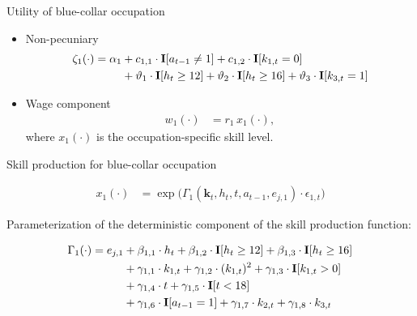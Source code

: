 \begin{frame}{Utility of blue-collar occupation}\vspace{0.25cm}

	\begin{itemize}\setlength\itemsep{1em}
	\item Non-pecuniary
  \begin{align*}
  \zeta_{1}(\cdot)  = \alpha_1 & + c_{1,1} \cdot {\textbf{I}}[a_{t-1} \neq 1] + c_{1,2} \cdot {\textbf{I}}[k_{1,t} = 0] \\
                              & + \vartheta_1 \cdot {\textbf{I}}[h_t \geq 12] + \vartheta_2 \cdot {\textbf{I}}[h_t \geq 16] + \vartheta_3 \cdot {\textbf{I}}[k_{3,t} = 1]
  \end{align*}

	 \item Wage component
	 \begin{align*}
	 w_{1}(\cdot) & = r_{1} \, x_{1}(\cdot),
	 \end{align*}
where  $x_{1}(\cdot)$ is the occupation-specific skill level.
 \end{itemize}
\end{frame}
\begin{frame}{Skill production for blue-collar occupation}

\begin{align*}
	x_{1}(\cdot) & = \exp \big( \Gamma_{1}(\bm{k}_t,  h_t, t, a_{t-1}, e_{j,1}) \cdot \epsilon_{1,t} \big)
\end{align*}

Parameterization of the deterministic component of the skill production function:\vspace{-0.5cm}

\begin{align*}
     \Gamma_1(\cdot) = e_{j,1} & + \beta_{1,1} \cdot h_t + \beta_{1, 2} \cdot {\textbf{I}}[h_t \geq 12] + \beta_{1,3} \cdot {\textbf{I}}[h_t\geq 16]\\
                                   & + \gamma_{1, 1} \cdot  k_{1,t} + \gamma_{1,2} \cdot  (k_{1,t})^2 + \gamma_{1,3} \cdot  {\textbf{I}}[k_{1,t} > 0] \\
                                 & + \gamma_{1,4} \cdot  t + \gamma_{1,5} \cdot {\textbf{I}}[t < 18]\\
                                   & + \gamma_{1,6} \cdot {\textbf{I}}[a_{t-1} = 1] + \gamma_{1,7} \cdot  k_{2,t} + \gamma_{1,8} \cdot  k_{3,t}
\end{align*}
\end{frame}
